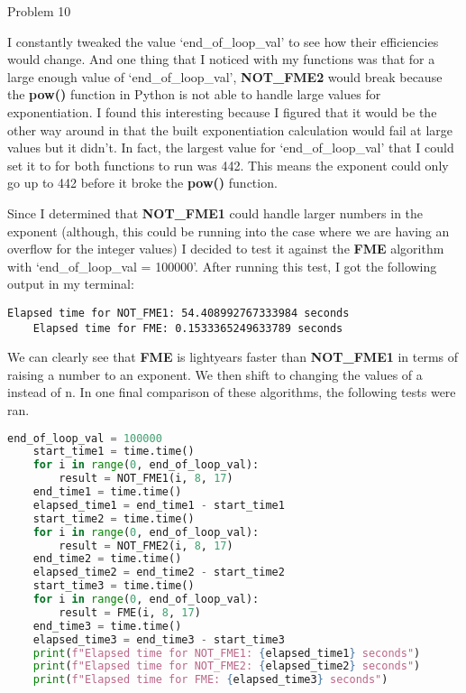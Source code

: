 \begin{problem}{Problem 10}
\begin{Highlight}[Solution]
        I constantly tweaked the value `end\_of\_loop\_val' to see how their efficiencies would change. And one thing that I noticed with my functions was that for a large enough value of 
        `end\_of\_loop\_val', \textbf{NOT\_FME2} would break because the \textbf{pow()} function in Python is not able to handle large values for exponentiation. I found this interesting because
        I figured that it would be the other way around in that the built exponentiation calculation would fail at large values but it didn't. In fact, the largest value for `end\_of\_loop\_val'
        that I could set it to for both functions to run was 442. This means the exponent could only go up to 442 before it broke the \textbf{pow()} function.

        Since I determined that \textbf{NOT\_FME1} could handle larger numbers in the exponent (although, this could be running into the case where we are having an overflow for the integer values)
        I decided to test it against the \textbf{FME} algorithm with `end\_of\_loop\_val = 100000'. After running this test, I got the following output in my terminal:
    \begin{lstlisting}[style=stackoverflow]
    Elapsed time for NOT_FME1: 54.408992767333984 seconds
    Elapsed time for FME: 0.1533365249633789 seconds
    \end{lstlisting}

        We can clearly see that \textbf{FME} is lightyears faster than \textbf{NOT\_FME1} in terms of raising a number to an exponent. We then shift to changing the values of a instead of n. In one final comparison of
        these algorithms, the following tests were ran.
    \begin{lstlisting}[style=stackoverflow, language=python]
    end_of_loop_val = 100000
    start_time1 = time.time()
    for i in range(0, end_of_loop_val):
        result = NOT_FME1(i, 8, 17)
    end_time1 = time.time()
    elapsed_time1 = end_time1 - start_time1
    start_time2 = time.time()
    for i in range(0, end_of_loop_val):
        result = NOT_FME2(i, 8, 17)
    end_time2 = time.time()
    elapsed_time2 = end_time2 - start_time2
    start_time3 = time.time()
    for i in range(0, end_of_loop_val):
        result = FME(i, 8, 17)
    end_time3 = time.time()
    elapsed_time3 = end_time3 - start_time3
    print(f"Elapsed time for NOT_FME1: {elapsed_time1} seconds")
    print(f"Elapsed time for NOT_FME2: {elapsed_time2} seconds")
    print(f"Elapsed time for FME: {elapsed_time3} seconds")
    \end{lstlisting}
        

\end{Highlight}
\end{problem}
